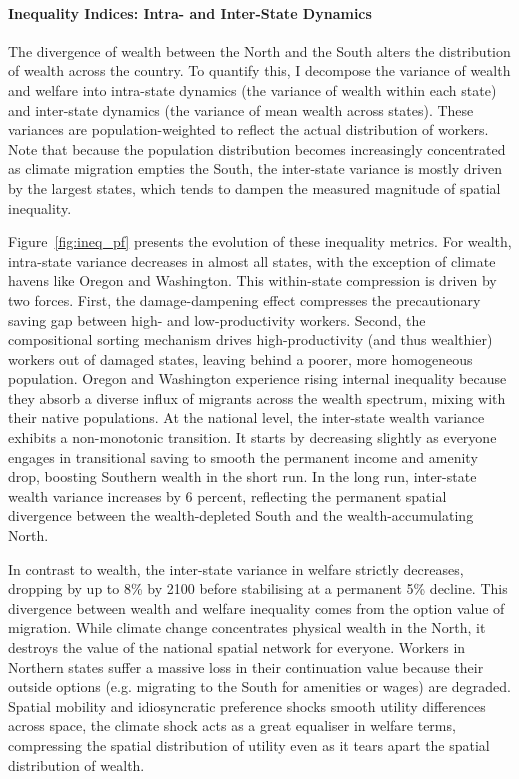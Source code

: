 \documentclass[12pt, a4paper]{article}
\begin{document}
\paragraph{Inequality Indices: Intra- and Inter-State Dynamics}
The divergence of wealth between the North and the South alters the distribution of wealth across the country. To quantify this, I decompose the variance of wealth and welfare into intra-state dynamics (the variance of wealth within each state) and inter-state dynamics (the variance of mean wealth across states). These variances are population-weighted to reflect the actual distribution of workers. Note that because the population distribution becomes increasingly concentrated as climate migration empties the South, the inter-state variance is mostly driven by the largest states, which tends to dampen the measured magnitude of spatial inequality.

Figure~\ref{fig:ineq_pf} presents the evolution of these inequality metrics. For wealth, intra-state variance decreases in almost all states, with the exception of climate havens like Oregon and Washington. This within-state compression is driven by two forces. First, the damage-dampening effect compresses the precautionary saving gap between high- and low-productivity workers. Second, the compositional sorting mechanism drives high-productivity (and thus wealthier) workers out of damaged states, leaving behind a poorer, more homogeneous population. Oregon and Washington experience rising internal inequality because they absorb a diverse influx of migrants across the wealth spectrum, mixing with their native populations. At the national level, the inter-state wealth variance exhibits a non-monotonic transition. It starts by decreasing slightly as everyone engages in transitional saving to smooth the permanent income and amenity drop, boosting Southern wealth in the short run. In the long run, inter-state wealth variance increases by 6 percent, reflecting the permanent spatial divergence between the wealth-depleted South and the wealth-accumulating North.

In contrast to wealth, the inter-state variance in welfare strictly decreases, dropping by up to 8\% by 2100 before stabilising at a permanent 5\% decline. This divergence between wealth and welfare inequality comes from the option value of migration. While climate change concentrates physical wealth in the North, it destroys the value of the national spatial network for everyone. Workers in Northern states suffer a massive loss in their continuation value because their outside options (e.g. migrating to the South for amenities or wages) are degraded. Spatial mobility and idiosyncratic preference shocks smooth utility differences across space, the climate shock acts as a great equaliser in welfare terms, compressing the spatial distribution of utility even as it tears apart the spatial distribution of wealth.

\end{document}
